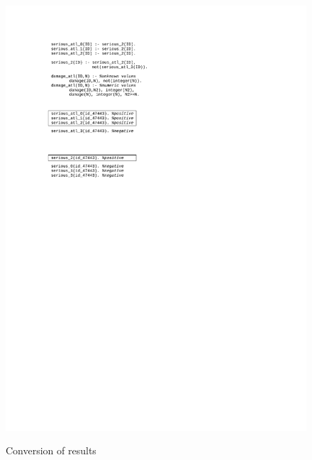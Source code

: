 \documentclass[authoryear,12pt]{elsarticle}
\begin{document}
\begin{figure}[ht]
\begin{minipage}[b]{0.5\hsize}
{		\\\includegraphics[width=\hsize]{img/monot2nomon}}
\caption{Conversion of results}
\label{img:monot2nomon_and_invert}
\end{minipage}
\end{figure}


%
%
%
\end{document}
